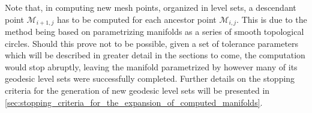 Note that, in computing new mesh points, organized in level sets, a descendant
point $\mathcal{M}_{i+1,j}$ has to be computed for each ancestor point
$\mathcal{M}_{i,j}$. This is due to the method being based on parametrizing
manifolds as a series of smooth topological circles. Should this prove
not to be possible, given a set of tolerance parameters which will be
described in greater detail in the sections to come, the computation would
stop abruptly, leaving the manifold parametrized by however many of its
geodesic level sets were successfully completed. Further details on the
stopping criteria for the generation of new geodesic level sets will be
presented in
\cref{sec:stopping_criteria_for_the_expansion_of_computed_manifolds}.
